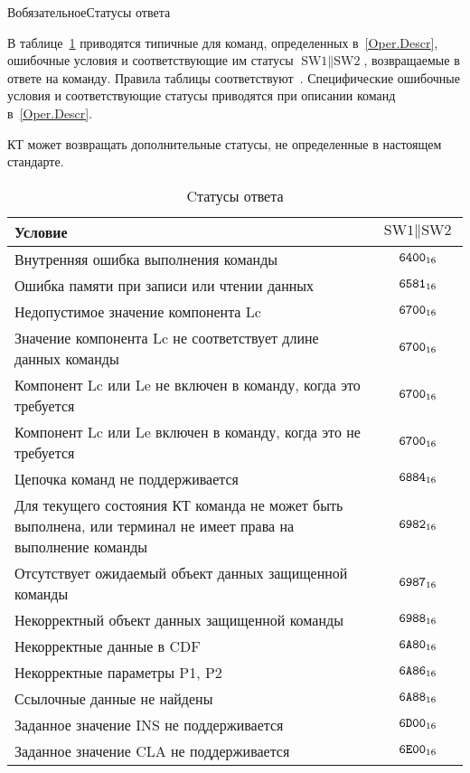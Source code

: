 \begin{appendix}{В}{обязательное}{Статусы ответа}
\label{ERRORS}

\mbox{}

В таблице~\ref{Table.Errors.General} приводятся типичные для команд, 
определенных в~\ref{Oper.Descr},
ошибочные условия и соответствующие им 
статусы $\text{SW1} \parallel \text{SW2}$,
возвращаемые в ответе на команду.
Правила таблицы соответствуют~\cite{APDU}.
%
Специфические ошибочные условия и соответствующие статусы приводятся 
при описании команд в~\ref{Oper.Descr}.

КТ может возвращать дополнительные статусы,
не определенные в настоящем стандарте.

\begin{table}[hbt]
\caption{Cтатусы ответа}
\label{Table.Errors.General}
\begin{tabular}{|p{14cm}|c|}
\hline
Условие & $\text{SW1} \parallel \text{SW2}$\\
\hline
\hline
Внутренняя ошибка выполнения команды & $\texttt{6400}_{16}$ \\
\hline
Ошибка памяти при записи или чтении данных & $\texttt{6581}_{16}$ \\
\hline
Недопустимое значение компонента Lc & $\texttt{6700}_{16}$ \\
\hline
Значение компонента Lc не соответствует длине данных команды& $\texttt{6700}_{16}$ \\
\hline
Компонент Lc или Le не включен в команду, 
когда это требуется& $\texttt{6700}_{16}$ \\
\hline
Компонент Lc или Le включен в команду, 
когда это не требуется& $\texttt{6700}_{16}$ \\
\hline
Цепочка команд не поддерживается & $\texttt{6884}_{16}$ \\
\hline
Для текущего состояния КТ команда не может быть выполнена,
или терминал не имеет права на выполнение команды & $\texttt{6982}_{16}$ \\
\hline
Отсутствует ожидаемый объект данных защищенной 
команды & $\texttt{6987}_{16}$ \\
\hline
Некорректный объект данных защищенной команды & $\texttt{6988}_{16}$ \\
\hline
Некорректные данные в CDF & $\texttt{6A80}_{16}$ \\
\hline
Некорректные параметры P1, P2 & $\texttt{6A86}_{16}$ \\
\hline
Ссылочные данные не найдены & $\texttt{6A88}_{16}$ \\
\hline
Заданное значение INS не поддерживается & $\texttt{6D00}_{16}$ \\
\hline
Заданное значение CLA не поддерживается & $\texttt{6E00}_{16}$ \\
\hline
\end{tabular}
\end{table}

\mbox{}
\vfill
\mbox{}
\clearpage

\end{appendix}